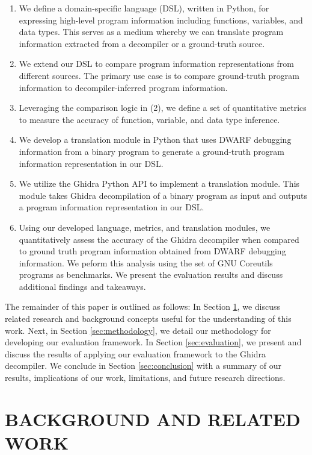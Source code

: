 \documentclass[a4paper,twoside]{article}
\begin{document}
\begin{enumerate}
    \item We define a domain-specific language (DSL), written in Python, for expressing high-level program information including functions, variables, and data types. This serves as a medium whereby we can translate program information extracted from a decompiler or a ground-truth source.
    \item We extend our DSL to compare program information representations from different sources. The primary use case is to compare ground-truth program information to decompiler-inferred program information.
    \item Leveraging the comparison logic in (2), we define a set of quantitative metrics to measure the accuracy of function, variable, and data type inference.
    \item We develop a translation module in Python that uses DWARF debugging information from a binary program to generate a ground-truth program information representation in our DSL.
    \item We utilize the Ghidra Python API to implement a translation module. This module takes Ghidra decompilation of a binary program as input and outputs a program information representation in our DSL.
    \item Using our developed language, metrics, and translation modules, we quantitatively assess the accuracy of the Ghidra decompiler when compared to ground truth program information obtained from DWARF debugging information. We peform this analysis using the set of GNU Coreutils programs as benchmarks. We present the evaluation results and discuss additional findings and takeaways.
\end{enumerate}

The remainder of this paper is outlined as follows: In Section \ref{sec:background-related-work}, we discuss related research and background concepts useful for the understanding of this work. Next, in Section \ref{sec:methodology}, we detail our methodology for developing our evaluation framework. In Section \ref{sec:evaluation}, we present and discuss the results of applying our evaluation framework to the Ghidra decompiler. We conclude in Section \ref{sec:conclusion} with a summary of our results, implications of our work, limitations, and future research directions.

\section{\uppercase{Background and Related Work}} \label{sec:background-related-work}
\end{document}
